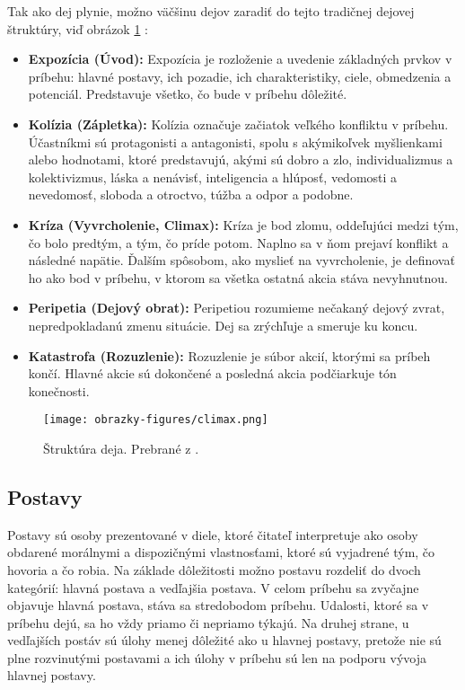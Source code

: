 Tak ako dej plynie, možno väčšinu dejov zaradiť do tejto tradičnej dejovej štruktúry, viď obrázok \ref{climax} :
\begin{itemize}
	\item \textbf{Expozícia (Úvod):} Expozícia je rozloženie a uvedenie základných prvkov v príbehu: hlavné postavy, ich pozadie, ich charakteristiky, ciele, obmedzenia a potenciál. Predstavuje všetko, čo bude v príbehu dôležité.
    \item \textbf{Kolízia (Zápletka):} Kolízia označuje začiatok veľkého konfliktu v príbehu. Účastníkmi sú protagonisti a antagonisti, spolu s akýmikoľvek myšlienkami alebo hodnotami, ktoré predstavujú, akými sú dobro a zlo, individualizmus a kolektivizmus, láska a nenávisť, inteligencia a hlúposť, vedomosti a nevedomosť, sloboda a otroctvo, túžba a odpor a podobne.
    \item \textbf{Kríza (Vyvrcholenie, Climax):} Kríza je bod zlomu, oddeľujúci medzi tým, čo bolo predtým, a tým, čo príde potom. Naplno sa v ňom prejaví konflikt a následné napätie. Ďalším spôsobom, ako myslieť na vyvrcholenie, je definovať ho ako bod v príbehu, v ktorom sa všetka ostatná akcia stáva nevyhnutnou.
    \item \textbf{Peripetia (Dejový obrat):} Peripetiou rozumieme nečakaný dejový zvrat, nepredpokladanú zmenu situácie. Dej sa zrýchľuje a smeruje ku koncu.
    \item \textbf{Katastrofa (Rozuzlenie):} Rozuzlenie je súbor akcií, ktorými sa príbeh končí. Hlavné akcie sú dokončené a posledná akcia podčiarkuje tón konečnosti.
\end{itemize}
\begin{figure}[hbt]
	\centering
	\texttt{[image: obrazky-figures/climax.png]}
	\caption{Štruktúra deja. Prebrané z \cite{ClimaxImage}.}
	\label{climax}
\end{figure}



\subsection*{Postavy}
Postavy sú osoby prezentované v diele, ktoré čitateľ interpretuje ako osoby obdarené morálnymi a dispozičnými vlastnosťami, ktoré sú vyjadrené tým, čo hovoria a čo robia.
Na základe dôležitosti možno postavu rozdeliť do dvoch kategórií: hlavná postava a vedľajšia postava. V celom príbehu sa zvyčajne objavuje hlavná postava, stáva sa stredobodom príbehu. Udalosti, ktoré sa v príbehu dejú, sa ho vždy priamo či nepriamo týkajú. Na druhej strane, u vedľajších postáv sú úlohy menej dôležité ako u hlavnej postavy, pretože nie sú plne rozvinutými postavami a ich úlohy v príbehu sú len na podporu vývoja hlavnej postavy.

